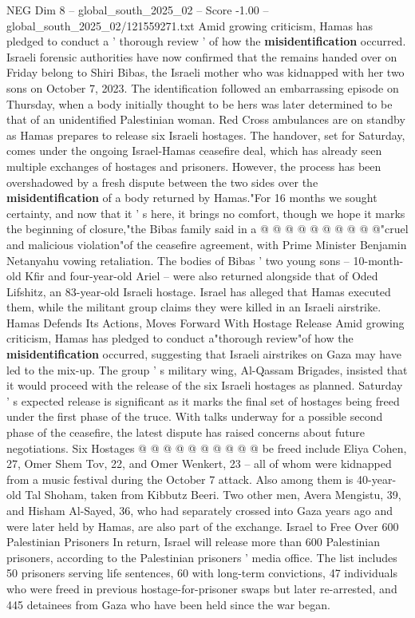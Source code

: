 \begin{textsample}{NEG Dim 8 – global\_south\_2025\_02 – Score -1.00 – global\_south\_2025\_02/121559271.txt}  \label{ex:f8_neg_373}
Amid growing criticism, Hamas has pledged to conduct a ' thorough review ' of how the \textbf{misidentification} occurred.
Israeli forensic authorities have now confirmed that the remains handed over on Friday belong to Shiri Bibas, the Israeli mother who was kidnapped with her two sons on October 7, 2023.
The identification followed an embarrassing episode on Thursday, when a body initially thought to be hers was later determined to be that of an unidentified Palestinian woman.
Red Cross ambulances are on standby as Hamas prepares to release six Israeli hostages.
The handover, set for Saturday, comes under the ongoing Israel-Hamas ceasefire deal, which has already seen multiple exchanges of hostages and prisoners.
However, the process has been overshadowed by a fresh dispute between the two sides over the \textbf{misidentification} of a body returned by Hamas."For 16 months we sought certainty, and now that it ' s here, it brings no comfort, though we hope it marks the beginning of closure,"the Bibas family said in a @ @ @ @ @ @ @ @ @ @"cruel and malicious violation"of the ceasefire agreement, with Prime Minister Benjamin Netanyahu vowing retaliation.
The bodies of Bibas ' two young sons -- 10-month-old Kfir and four-year-old Ariel -- were also returned alongside that of Oded Lifshitz, an 83-year-old Israeli hostage.
Israel has alleged that Hamas executed them, while the militant group claims they were killed in an Israeli airstrike.
Hamas Defends Its Actions, Moves Forward With Hostage Release Amid growing criticism, Hamas has pledged to conduct a"thorough review"of how the \textbf{misidentification} occurred, suggesting that Israeli airstrikes on Gaza may have led to the mix-up.
The group ' s military wing, Al-Qassam Brigades, insisted that it would proceed with the release of the six Israeli hostages as planned.
Saturday ' s expected release is significant as it marks the final set of hostages being freed under the first phase of the truce.
With talks underway for a possible second phase of the ceasefire, the latest dispute has raised concerns about future negotiations.
Six Hostages @ @ @ @ @ @ @ @ @ @ be freed include Eliya Cohen, 27, Omer Shem Tov, 22, and Omer Wenkert, 23 -- all of whom were kidnapped from a music festival during the October 7 attack.
Also among them is 40-year-old Tal Shoham, taken from Kibbutz Beeri.
Two other men, Avera Mengistu, 39, and Hisham Al-Sayed, 36, who had separately crossed into Gaza years ago and were later held by Hamas, are also part of the exchange.
Israel to Free Over 600 Palestinian Prisoners In return, Israel will release more than 600 Palestinian prisoners, according to the Palestinian prisoners ' media office.
The list includes 50 prisoners serving life sentences, 60 with long-term convictions, 47 individuals who were freed in previous hostage-for-prisoner swaps but later re-arrested, and 445 detainees from Gaza who have been held since the war began.

\end{textsample}
